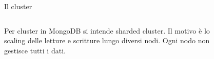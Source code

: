 \documentclass[xcolor=svgnames, aspectratio=169]{beamer}
\begin{document}
\begin{frame}{Il cluster}
    \begin{columns}[t]
        Per cluster in MongoDB si intende sharded cluster. Il motivo è lo scaling delle letture e scritture lungo diversi nodi. Ogni nodo non gestisce tutti i dati.
        
        \vspace*{-32pt}
        \begin{figure}[H]
            \centering
            \noindent{}
        \end{figure}
    \end{columns}
\end{frame}

\end{document}
